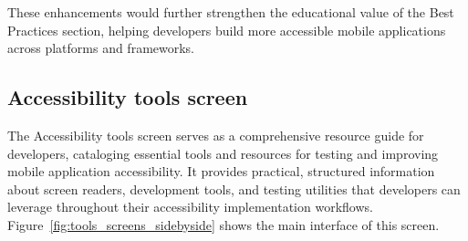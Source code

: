 These enhancements would further strengthen the educational value of the Best Practices section, helping developers build more accessible mobile applications across platforms and frameworks.

\subsection{Accessibility tools screen}
\label{subsec:tools-screen}

The Accessibility tools screen serves as a comprehensive resource guide for developers, cataloging essential tools and resources for testing and improving mobile application accessibility. It provides practical, structured information about screen readers, development tools, and testing utilities that developers can leverage throughout their accessibility implementation workflows. Figure~\ref{fig:tools_screens_sidebyside} shows the main interface of this screen.

